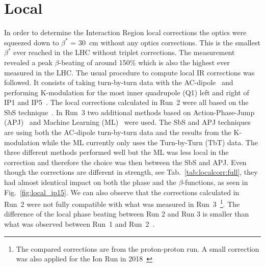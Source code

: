 \documentclass{cernatsnote}
\begin{document}
\section{Local}

In order to determine the Interaction Region local corrections the optics were squeezed down to $\beta^*$ = 30~cm without any optics corrections. This is the smallest $\beta^*$ ever reached in the LHC without triplet corrections. The measurement revealed a peak $\beta$-beating of around 150\% which is also the highest ever measured in the LHC. The usual procedure to compute local IR corrections was followed. It consists of taking turn-by-turn data with the AC-dipole~\cite{record} and performing K-modulation for the most inner quadrupole (Q1) left and right of IP1 and IP5~\cite{felixkmod}. 
The local corrections calculated in Run~2 were all based on the SbS technique~\cite{tomasCERNLargeHadron2010, jaime_rdt}. In Run~3 two additional methods based on Action-Phase-Jump (APJ)~\cite{cardona17, cardona20,Garcia_Morales:IPAC21-MOPAB186, ipac2022_apj} and Machine Learning (ML)~\cite{IPAC2020Fol , epj_efol, efol_mlcorr_this_conference} were used. The SbS and APJ techniques are using both the AC-dipole turn-by-turn data and the results from the K-modulation while the ML currently only uses the Turn-by-Turn (TbT) data. The three different methods performed well but the ML was less local in the correction and therefore the choice was then between the SbS and APJ. Even though the corrections are different in strength, see Tab.~\ref{tab:localcorr:full}, they had almost identical impact on both the phase and the $\beta$-functions, as seen in Fig.~\ref{fig:local_ip15}. We can also observe that the corrections calculated in Run~2 were not fully compatible with what was measured in Run~3~\footnote{The compared corrections are from the proton-proton run. A small correction was also applied for the Ion Run in 2018~\cite{tobias_evian19}}. The difference of the local phase beating between Run 2 and Run 3 is smaller than what was observed between Run~1 and Run~2~\cite{evian_2015_langer}.
\end{document}
